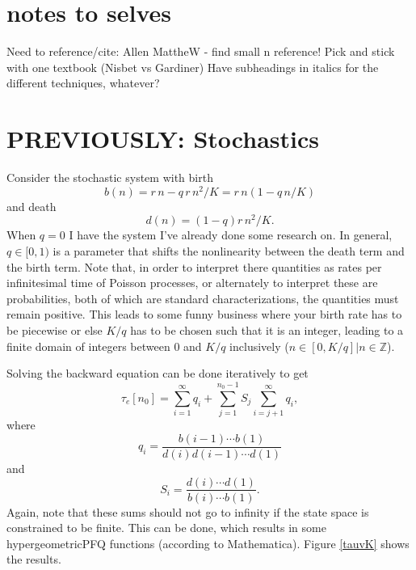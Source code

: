 
\section{notes to selves}
Need to reference/cite: Allen
MattheW - find small n reference!
Pick and stick with one textbook (Nisbet vs Gardiner)
Have subheadings in italics for the different techniques, whatever?



















\section{PREVIOUSLY: Stochastics}
Consider the stochastic system with birth
\begin{equation}
 b(n) = r\,n - q\,r\,n^2/K = r\,n\left(1-q\,n/K\right)
\end{equation}
and death
\begin{equation}
 d(n) = (1-q)r\,n^2/K.
\end{equation}
When $q=0$ I have the system I've already done some research on.
In general, $q\in[0,1)$ is a parameter that shifts the nonlinearity between the death term and the birth term.
Note that, in order to interpret there quantities as rates per infinitesimal time of Poisson processes, or alternately to interpret these are probabilities, both of which are standard characterizations, the quantities must remain positive.
This leads to some funny business where your birth rate has to be piecewise or else $K/q$ has to be chosen such that it is an integer, leading to a finite domain of integers between $0$ and $K/q$ inclusively ($n\in[0,K/q]|n\in\mathbb{Z}$).

Solving the backward equation can be done iteratively to get
\begin{equation} \label{etime-approx0}
 \tau_e[n_0] = \sum_{i=1}^{\infty}q_i + \sum_{j=1}^{n_0-1} S_j\sum_{i=j+1}^{\infty}q_i,
\end{equation}
where
\begin{equation}
 q_i = \frac{b(i-1)\cdots b(1)}{d(i)d(i-1)\cdots d(1)}
\end{equation}
and
\begin{equation}
 S_i = \frac{d(i)\cdots d(1)}{b(i)\cdots b(1)}.
\end{equation}
Again, note that these sums should not go to infinity if the state space is constrained to be finite.
This can be done, which results in some hypergeometricPFQ functions (according to Mathematica).
Figure \ref{tauvK} shows the results.

